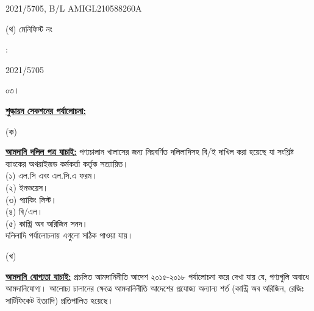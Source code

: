 \documentclass[12pt]{article}
\newcommand{\menifest}{2021/5705}
\newcommand{\blno}{AMIGL210588260A}
\begin{document}
\begin{minipage}[t]{0.53\linewidth}
{\menifest}, B/L {\blno}
\\
\end{minipage}
\begin{minipage}[t]{0.05\linewidth}
\hspace*{1em}
\end{minipage}
\begin{minipage}[t]{0.40\linewidth}
(থ) মেনিফিস্ট নং
\end{minipage}
\begin{minipage}[t]{0.02\linewidth}
:
\end{minipage}
\begin{minipage}[t]{0.53\linewidth}
{\menifest}
\\
\end{minipage}
\normalsize
\begin{minipage}[t]{0.05\linewidth}
০৩।
\end{minipage}
\begin{minipage}[t]{0.95\linewidth}
\underline{\textbf{শুল্কায়ন সেকশনের পর্যালোচনা:}}
\end{minipage}
\begin{minipage}[t]{0.05\linewidth}
\hspace{1em}
\end{minipage}
\begin{minipage}[t]{0.05\linewidth}
(ক)
\end{minipage}
\begin{minipage}[t]{0.90\linewidth}
\underline{\textbf{আমদানি দলিল পত্র যাচাই:}}
পণ্যচালান খালাসের জন্য নিম্নবর্ণিত দলিলাদিসহ বি/ই দাখিল করা
হয়েছে যা সংশ্লিষ্ট ব্যাংকের অথরাইজড কর্মকর্তা কর্তৃক সত্যায়িত।
\\
(১) এল.সি এবং এল.সি.এ ফরম।
\\
(২) ইনভয়েস।
\\
(৩) প্যাকিং লিস্ট।
\\
(৪) বি/এল।
\\
(৫) কান্ট্রি অব অরিজিন সনদ।
\\
দলিলাদি পর্যালোচনায় এগুলো
সঠিক পাওয়া যায়।
\\
\end{minipage}
\begin{minipage}[t]{0.05\linewidth}
\hspace{1em}
\end{minipage}
\begin{minipage}[t]{0.05\linewidth}
(খ)
\end{minipage}
\begin{minipage}[t]{0.90\linewidth}
\underline{\textbf{আমদানি যোগ্যতা যাচাই:}}
প্রচলিত আমদানিনীতি আদেশ ২০১৫-২০১৮ পর্যালোচনা করে দেখা যায় যে, পণ্যগুলি অবাধে আমদানিযোগ্য।
আলোচ্য চালানের ক্ষেত্রে আমদানিনীতি আদেশের প্রযোজ্য অন্যান্য শর্ত (কান্ট্রি অব অরিজিন, রেজিঃ
সার্টিফিকেট ইত্যাদি) প্রতিপালিত হয়েছে।
\\
\end{minipage}
\end{document}
